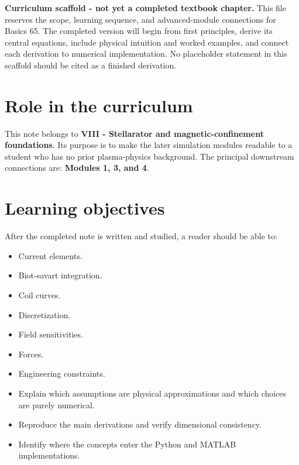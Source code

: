\documentclass[11pt]{article}
\begin{document}

\begin{overviewbox}
\textbf{Curriculum scaffold - not yet a completed textbook chapter.} This file reserves the scope, learning sequence, and advanced-module connections for Basics 65. The completed version will begin from first principles, derive its central equations, include physical intuition and worked examples, and connect each derivation to numerical implementation. No placeholder statement in this scaffold should be cited as a finished derivation.
\end{overviewbox}

\ProjectTOC

\section{Role in the curriculum}
This note belongs to \textbf{VIII - Stellarator and magnetic-confinement foundations}. Its purpose is to make the later simulation modules readable to a student who has no prior plasma-physics background. The principal downstream connections are: \textbf{Modules 1, 3, and 4}.

\section{Learning objectives}
After the completed note is written and studied, a reader should be able to:
\begin{itemize}[leftmargin=1.6em]
\item Current elements.
\item Biot-savart integration.
\item Coil curves.
\item Discretization.
\item Field sensitivities.
\item Forces.
\item Engineering constraints.
\item Explain which assumptions are physical approximations and which choices are purely numerical.
\item Reproduce the main derivations and verify dimensional consistency.
\item Identify where the concepts enter the Python and MATLAB implementations.
\end{itemize}
\end{document}
